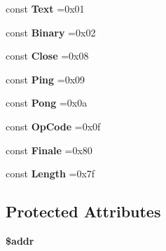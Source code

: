 \begin{DoxyCompactItemize}
\item 
\hypertarget{class_c_l_i_1_1_w_s_aa9141b93fff959a11eb401b7100b7a90}{}\label{class_c_l_i_1_1_w_s_aa9141b93fff959a11eb401b7100b7a90} 
const {\bfseries Text} =0x01
\item 
\hypertarget{class_c_l_i_1_1_w_s_a03a9c4aa0f0905b7512a268997cbe41f}{}\label{class_c_l_i_1_1_w_s_a03a9c4aa0f0905b7512a268997cbe41f} 
const {\bfseries Binary} =0x02
\item 
\hypertarget{class_c_l_i_1_1_w_s_a12592aa7eb9f1570fc962867a7fcc904}{}\label{class_c_l_i_1_1_w_s_a12592aa7eb9f1570fc962867a7fcc904} 
const {\bfseries Close} =0x08
\item 
\hypertarget{class_c_l_i_1_1_w_s_ad953baab1d22f9595927e18f6ac8ec16}{}\label{class_c_l_i_1_1_w_s_ad953baab1d22f9595927e18f6ac8ec16} 
const {\bfseries Ping} =0x09
\item 
\hypertarget{class_c_l_i_1_1_w_s_a969c5d07e26af01d3523ec69379a4df5}{}\label{class_c_l_i_1_1_w_s_a969c5d07e26af01d3523ec69379a4df5} 
const {\bfseries Pong} =0x0a
\item 
\hypertarget{class_c_l_i_1_1_w_s_af8603b6923a1a089b57cb849bc062148}{}\label{class_c_l_i_1_1_w_s_af8603b6923a1a089b57cb849bc062148} 
const {\bfseries Op\+Code} =0x0f
\item 
\hypertarget{class_c_l_i_1_1_w_s_afa14d696444a689a5be47c64ce568983}{}\label{class_c_l_i_1_1_w_s_afa14d696444a689a5be47c64ce568983} 
const {\bfseries Finale} =0x80
\end{DoxyCompactItemize}

{\bf }\par
\begin{DoxyCompactItemize}
\item 
\hypertarget{class_c_l_i_1_1_w_s_a62a38e46cf476443cf933907fe86e684}{}\label{class_c_l_i_1_1_w_s_a62a38e46cf476443cf933907fe86e684} 
const {\bfseries Length} =0x7f
\end{DoxyCompactItemize}

\subsection*{Protected Attributes}
\begin{DoxyCompactItemize}
\item 
\hypertarget{class_c_l_i_1_1_w_s_a80e1c53e5ae106ed41bc69db8cdcdf78}{}\label{class_c_l_i_1_1_w_s_a80e1c53e5ae106ed41bc69db8cdcdf78} 
{\bfseries \$addr}
\end{DoxyCompactItemize}


